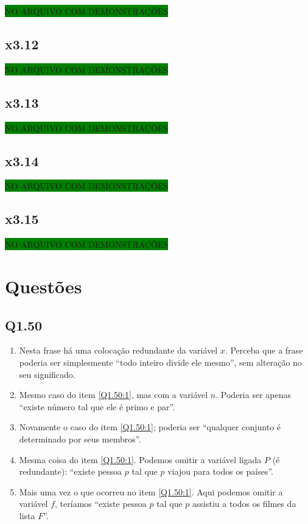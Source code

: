 \documentclass[portuguese,a4paper,12pt]{article}
\begin{document}
	\colorbox{green}{NO ARQUIVO COM DEMONSTRAÇÕES}
	
	\subsection*{x3.12}
	
	\colorbox{green}{NO ARQUIVO COM DEMONSTRAÇÕES}
	
	\subsection*{x3.13}
	
	\colorbox{green}{NO ARQUIVO COM DEMONSTRAÇÕES}
	
	\subsection*{x3.14}
	
	\colorbox{green}{NO ARQUIVO COM DEMONSTRAÇÕES}
	
	\subsection*{x3.15}
	
	\colorbox{green}{NO ARQUIVO COM DEMONSTRAÇÕES}
	
	\section*{\centering Questões}
	
	\subsection*{Q1.50}
	
	\begin{enumerate}[label=(\arabic*)]
		\item \label{Q1.50:1} Nesta frase há uma colocação redundante da variável $x$. Perceba que a frase poderia ser simplesmente ``todo inteiro divide ele mesmo'', sem alteração no seu significado.
		\item Mesmo caso do item \ref{Q1.50:1}, mas com a variável $n$. Poderia ser apenas ``existe número tal que ele é primo e par''.
		\item Novamente o caso do item \ref{Q1.50:1}; poderia ser ``qualquer conjunto é determinado por seus membros''.
		\item Mesma coisa do item \ref{Q1.50:1}. Podemos omitir a variável ligada $P$ (é redundante): ``existe pessoa $p$ tal que $p$ viajou para todos os países''.
		\item Mais uma vez o que ocorreu no item \ref{Q1.50:1}. Aqui podemos omitir a variável $f$, teríamos ``existe pessoa $p$ tal que $p$ assistiu a todos os filmes da lista $F$''.
	\end{enumerate}
	
\end{document}
